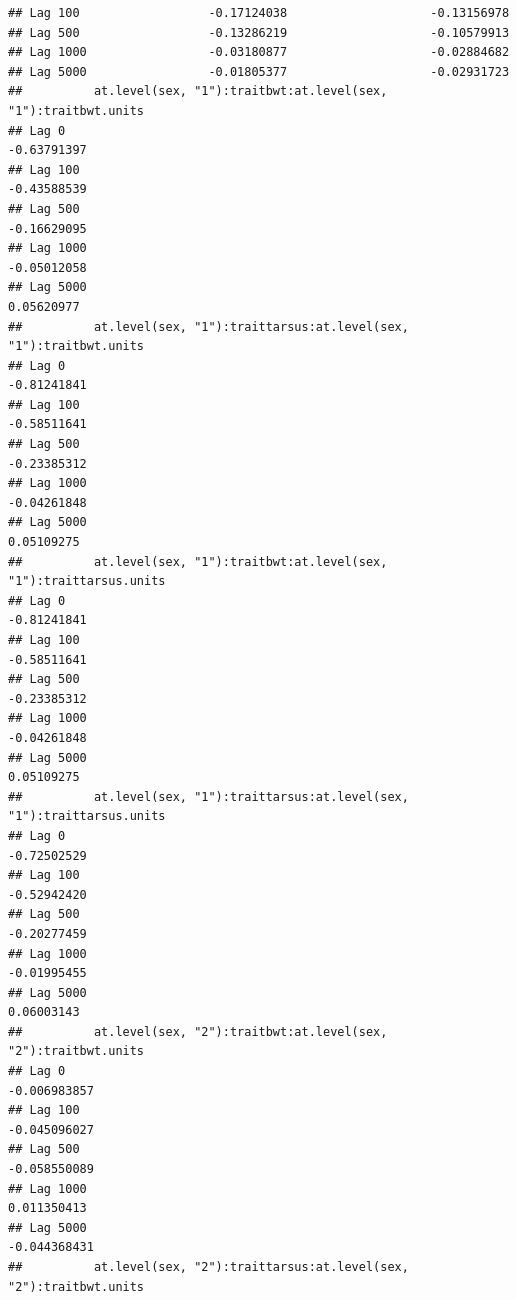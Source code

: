 \documentclass[
  12pt,
]{book}
\begin{document}
\begin{verbatim}
## Lag 100                  -0.17124038                    -0.13156978
## Lag 500                  -0.13286219                    -0.10579913
## Lag 1000                 -0.03180877                    -0.02884682
## Lag 5000                 -0.01805377                    -0.02931723
##          at.level(sex, "1"):traitbwt:at.level(sex, "1"):traitbwt.units
## Lag 0                                                      -0.63791397
## Lag 100                                                    -0.43588539
## Lag 500                                                    -0.16629095
## Lag 1000                                                   -0.05012058
## Lag 5000                                                    0.05620977
##          at.level(sex, "1"):traittarsus:at.level(sex, "1"):traitbwt.units
## Lag 0                                                         -0.81241841
## Lag 100                                                       -0.58511641
## Lag 500                                                       -0.23385312
## Lag 1000                                                      -0.04261848
## Lag 5000                                                       0.05109275
##          at.level(sex, "1"):traitbwt:at.level(sex, "1"):traittarsus.units
## Lag 0                                                         -0.81241841
## Lag 100                                                       -0.58511641
## Lag 500                                                       -0.23385312
## Lag 1000                                                      -0.04261848
## Lag 5000                                                       0.05109275
##          at.level(sex, "1"):traittarsus:at.level(sex, "1"):traittarsus.units
## Lag 0                                                            -0.72502529
## Lag 100                                                          -0.52942420
## Lag 500                                                          -0.20277459
## Lag 1000                                                         -0.01995455
## Lag 5000                                                          0.06003143
##          at.level(sex, "2"):traitbwt:at.level(sex, "2"):traitbwt.units
## Lag 0                                                     -0.006983857
## Lag 100                                                   -0.045096027
## Lag 500                                                   -0.058550089
## Lag 1000                                                   0.011350413
## Lag 5000                                                  -0.044368431
##          at.level(sex, "2"):traittarsus:at.level(sex, "2"):traitbwt.units

\end{verbatim}
\end{document}
